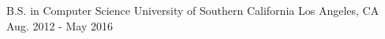 

\begin{cventries}

  \cventry
    {B.S. in Computer Science} %
    {University of Southern California} %
    {Los Angeles, CA} %
    {Aug. 2012 - May 2016} %
\end{cventries}
